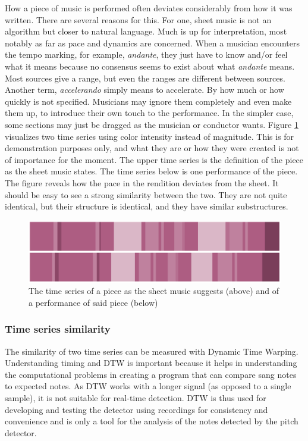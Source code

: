 How a piece of music is performed often deviates considerably from how it was written. There are several reasons for this. For one, sheet music is not an algorithm but closer to natural language. Much is up for interpretation, most notably as far as pace and dynamics are concerned. When a musician encounters the tempo marking, for example, \textit{andante}, they just have to know and/or feel what it means because no consensus seems to exist about what \textit{andante} means. Most sources give a range, but even the ranges are different between sources. Another term, \textit{accelerando} simply means to accelerate. By how much or how quickly is not specified. Musicians may ignore them completely and even make them up, to introduce their own touch to the performance. In the simpler case, some sections may just be dragged as the musician or conductor wants. Figure \ref{fig:performance-sheet} visualizes two time series using color intensity instead of magnitude. This is for demonstration purposes only, and what they are or how they were created is not of importance for the moment. The upper time series is the definition of the piece as the sheet music states. The time series below is one performance of the piece. The figure reveals how the pace in the rendition deviates from the sheet. It should be easy to see a strong similarity between the two. They are not quite identical, but their structure is identical, and they have similar substructures. 

\begin{figure}[ht]
    \centering
    \includegraphics[width=\textwidth]{./images/performance-sheet.png}
    \caption{The time series of a piece as the sheet music suggests (above) and of a performance of said piece (below)\label{fig:performance-sheet}}
\end{figure}

\subsubsection{Time series similarity}
The similarity of two time series can be measured with Dynamic Time Warping. Understanding timing and DTW is important because it helps in understanding the computational problems in  creating a program that can compare sang notes to expected notes. As DTW works with a longer signal (as opposed to a single sample), it is not suitable for real-time detection. DTW is thus used for developing and testing the detector using recordings for consistency and convenience and is only a tool for the analysis of the notes detected by the pitch detector. 

